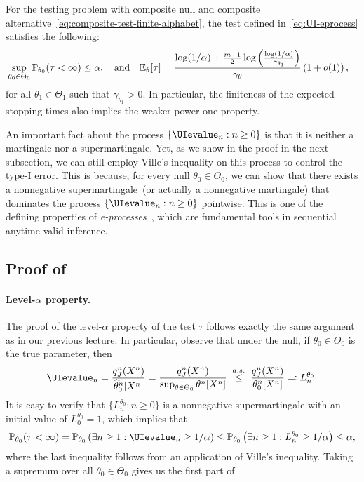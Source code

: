 \documentclass[12pt]{article}
\begin{document}
\begin{theorem}
    \label{theorem:UI-test} For the testing problem with composite null and composite alternative~\eqref{eq:composite-test-finite-alphabet}, the test defined in~\eqref{eq:UI-eprocess} satisfies the following: 
    \begin{align}
        &\sup_{\theta_0 \in \Theta_0} \mathbb{P}_{\theta_0}(\tau< \infty) \leq \alpha, \quad \text{and} \quad
          \mathbb{E}_{\theta}[\tau] = \frac{\log(1/\alpha) + \frac{m-1}{2} \log \left( \frac{\log(1/\alpha)}{\gamma_{\theta_1}} \right)}{\gamma_\theta} \left( 1 + o(1) \right),
    \end{align}
    for all $\theta_1 \in \Theta_1$ such that $\gamma_{\theta_1}>0$. 
    In particular, the finiteness of the expected stopping times also implies the weaker power-one property. 
\end{theorem}

An important fact about the process $\{\UIevalue_n: n \geq 0\}$ is that it is neither a martingale nor a supermartingale. Yet, as we show in the proof in the next subsection, we can still employ Ville's inequality on this process to control the type-I error. This is because, for every null $\theta_0 \in \Theta_0$, we can show that there exists a nonnegative supermartingale~(or actually a nonnegative martingale) that dominates the process $\{\UIevalue_n: n \geq 0\}$ pointwise. This is one of the defining properties of \emph{e-processes}~\citep[Lemma 6]{ramdas2020admissible}, which are fundamental tools in sequential anytime-valid inference.  

\subsection{Proof of~} 

\paragraph{Level-$\alpha$ property.} The proof of the level-$\alpha$ property of the test $\tau$ follows exactly the same argument as in our previous lecture. In particular, observe that  under the null, if $\theta_0 \in \Theta_0$ is the true parameter, then 
\begin{align}
    \UIevalue_n = \frac{q_J^n(X^n)}{\thetahat^n_0[X^n]} = \frac{q_J^n(X^n)}{\sup_{\theta \in \Theta_0} \theta^n[X^n]} \; \stackrel{a.s.}{\leq} \; \frac{q_J^n(X^n)}{ \theta_0^n[X^n]} \eqcolon L_n^{\theta_0}. 
\end{align}
It is easy to verify that $\{L_n^{\theta_0}: n \geq 0\}$ is a nonnegative supermartingale  with an initial value of $L_0^{\theta_0}=1$, which implies that 
\begin{align}
    \mathbb{P}_{\theta_0}(\tau < \infty) = \mathbb{P}_{\theta_0}\lp \exists n \geq 1: \UIevalue_n \geq 1/\alpha \rp \leq   \mathbb{P}_{\theta_0}\lp \exists n \geq 1: L_n^{\theta_0} \geq 1/\alpha \rp \leq \alpha, 
\end{align}
where the last inequality follows from an application of Ville's inequality.  Taking a supremum over all $\theta_0 \in \Theta_0$ gives us the first part of~. 
\end{document}
